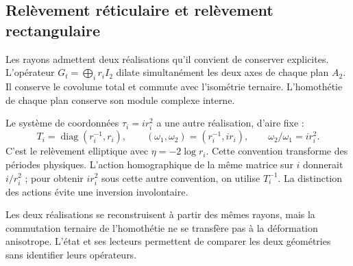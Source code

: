 \subsection{Relèvement réticulaire et relèvement rectangulaire}

Les rayons admettent deux réalisations qu’il convient de conserver explicites. L’opérateur \(G_t=\bigoplus_i r_iI_2\) dilate simultanément les deux axes de chaque plan \(A_2\). Il conserve le covolume total et commute avec l’isométrie ternaire. L’homothétie de chaque plan conserve son module complexe interne.

Le système de coordonnées \(\tau_i=ir_i^2\) a une autre réalisation, d’aire fixe :
\[
 T_i=\operatorname{diag}(r_i^{-1},r_i),\qquad
 (\omega_1,\omega_2)=(r_i^{-1},ir_i),\qquad
 \omega_2/\omega_1=ir_i^2.
\]
C'est le relèvement elliptique avec \(\eta=-2\log r_i\). Cette convention transforme des périodes physiques. L'action homographique de la même matrice sur \(i\) donnerait \(i/r_i^2\) ; pour obtenir \(ir_i^2\) sous cette autre convention, on utilise \(T_i^{-1}\). La distinction des actions évite une inversion involontaire.

Les deux réalisations se reconstruisent à partir des mêmes rayons, mais la commutation ternaire de l’homothétie ne se transfère pas à la déformation anisotrope. L’état et ses lecteurs permettent de comparer les deux géométries sans identifier leurs opérateurs.

